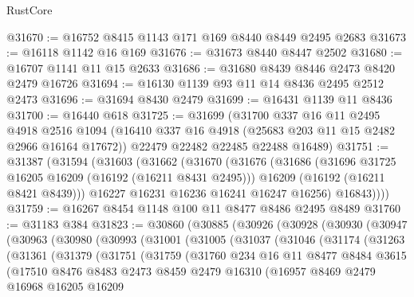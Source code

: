 \begin{lexlean}{RustCore}
\begin{coremodule}
@31670 := @16752 @8415 @1143 @171 @169 @8440 @8449 @2495 @2683
@31673 := @16118 @1142 @16 @169
@31676 := @31673 @8440 @8447 @2502
@31680 := @16707 @1141 @11 @15 @2633
@31686 := @31680 @8439 @8446 @2473 @8420 @2479 @16726
@31694 := @16130 @1139 @93 @11 @14 @8436 @2495 @2512 @2473
@31696 := @31694 @8430 @2479
@31699 := @16431 @1139 @11 @8436
@31700 := @16440 @618
@31725 := @31699
    (@31700
      @337
      @16
      @11
      @2495
      @4918
      @2516
      @1094
      (@16410 @337 @16 @4918 (@25683 @203 @11 @15 @2482 @2966 @16164 @17672))
      @22479
      @22482
      @22485
      @22488
      @16489)
@31751 := @31387
    (@31594
      (@31603
        (@31662
          (@31670
            (@31676
              (@31686
                (@31696 @31725 @16205 @16209 (@16192 (@16211 @8431 @2495)))
                @16209
                (@16192 (@16211 @8421 @8439)))
              @16227
              @16231
              @16236
              @16241
              @16247
              @16256)
            @16843))))
@31759 := @16267 @8454 @1148 @100 @11 @8477 @8486 @2495 @8489
@31760 := @31183 @384
@31823 := @30860
    (@30885
      (@30926
        (@30928
          (@30930
            (@30947
              (@30963
                (@30980
                  (@30993
                    (@31001
                      (@31005
                        (@31037
                          (@31046
                            (@31174
                              (@31263
                                (@31361
                                  (@31379
                                    (@31751
                                      (@31759
                                        (@31760
                                          @234
                                          @16
                                          @11
                                          @8477
                                          @8484
                                          @3615
                                          (@17510
                                            @8476
                                            @8483
                                            @2473
                                            @8459
                                            @2479
                                            @16310
                                            (@16957
                                              @8469
                                              @2479
                                              @16968
                                              @16205
                                              @16209

\end{coremodule}
\end{lexlean}

